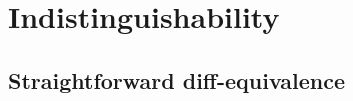 \section{Indistinguishability}

\newcommand{\pair}[1]{\langle #1 \rangle}



\newcommand{\fold}{\mathsf{fold}}




\subsection{Straightforward diff-equivalence}

